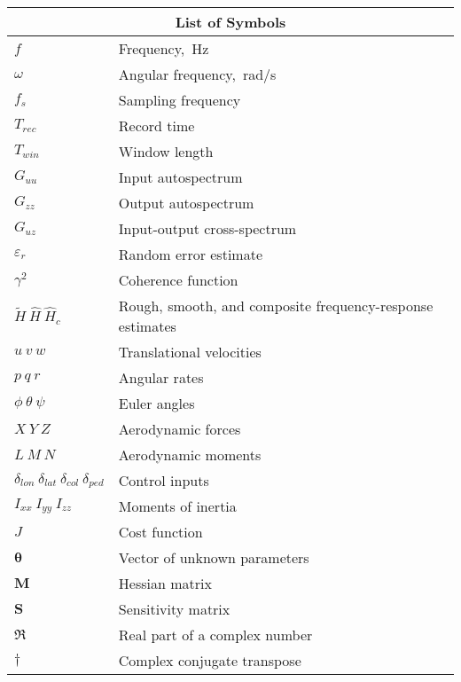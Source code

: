 

\begin{center}
\tabletail{\hline}
	\begin{tabular}{    p{3.0cm}  p{11cm} }
	\multicolumn{2}{c}{\textbf{List of Symbols}} \\	\hline \hline
	        $f$	   		    &	Frequency,~Hz\\
            $\omega$	    &   Angular frequency,~rad/s\\
            $f_s$	 	    &	Sampling frequency\\
            $T_{rec}$	    &	Record time\\
            $T_{win}$	    &	Window length\\
            $G_{uu}$	    &	Input autospectrum\\
            $G_{zz}$	    &   Output autospectrum\\
            $G_{uz}$	    &	Input-output cross-spectrum\\
            $\varepsilon_r$	    &	Random error estimate\\
            $\gamma^2$	    &   Coherence function\\     
            $\tilde{H}~\hat{H}~\hat{H}_c$	    & Rough, smooth, and composite frequency-response estimates\\ \hline
            $u~v~w$	    &	Translational velocities \\
            $p~q~r$	    &	Angular rates\\ 
            $\phi~\theta~\psi$	    &	Euler angles\\ 
            $X~Y~Z$	    &	Aerodynamic forces\\ 
            $L~M~N$	    &	Aerodynamic moments\\    
            $\delta_{lon}~\delta_{lat}~\delta_{col}~\delta_{ped}$	    &	Control inputs\\    
            $I_{xx}~I_{yy}~I_{zz}$	    &	Moments of inertia\\   \hline 
            $J$	    &	Cost function\\
            $\boldsymbol{\theta}$	    &	Vector of unknown parameters\\    
            $\boldsymbol{M}$	    &	Hessian matrix\\
            $\boldsymbol{S}$	    &	Sensitivity matrix\\    \hline
            $\Re$	    &	Real part of a complex number\\ 
            $\dagger$	    & Complex conjugate transpose	
	\end{tabular}%
\end{center}



